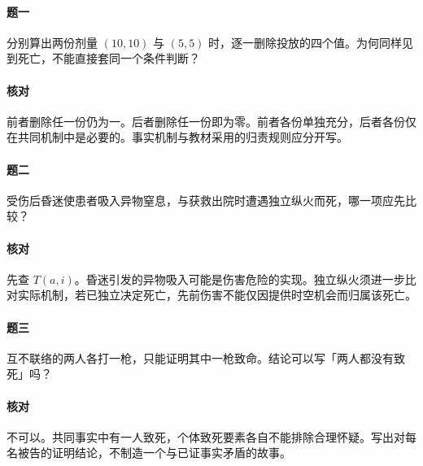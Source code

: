 \paragraph{题一}
分别算出两份剂量 $(10,10)$ 与 $(5,5)$ 时，逐一删除投放的四个值。为何同样见到死亡，不能直接套同一个条件判断？

\paragraph{核对}
前者删除任一份仍为一。后者删除任一份即为零。前者各份单独充分，后者各份仅在共同机制中是必要的。事实机制与教材采用的归责规则应分开写。

\paragraph{题二}
受伤后昏迷使患者吸入异物窒息，与获救出院时遭遇独立纵火而死，哪一项应先比较？

\paragraph{核对}
先查 $T(a,i)$。昏迷引发的异物吸入可能是伤害危险的实现。独立纵火须进一步比对实际机制，若已独立决定死亡，先前伤害不能仅因提供时空机会而归属该死亡。

\paragraph{题三}
互不联络的两人各打一枪，只能证明其中一枪致命。结论可以写「两人都没有致死」吗？

\paragraph{核对}
不可以。共同事实中有一人致死，个体致死要素各自不能排除合理怀疑。写出对每名被告的证明结论，不制造一个与已证事实矛盾的故事。
